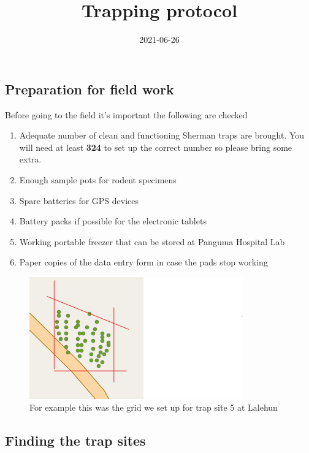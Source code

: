 \documentclass[
]{article}
\title{Trapping protocol}
\author{}
\date{\vspace{-2.5em}2021-06-26}
\providecommand{\tightlist}{%
  \setlength{\itemsep}{0pt}\setlength{\parskip}{0pt}}
\begin{document}
\maketitle

\hypertarget{preparation-for-field-work}{%
\subsection{Preparation for field
work}\label{preparation-for-field-work}}

Before going to the field it's important the following are checked

\begin{enumerate}
\def\labelenumi{\arabic{enumi}.}
\tightlist
\item
  Adequate number of clean and functioning Sherman traps are brought.
  You will need at least \textbf{324} to set up the correct number so
  please bring some extra.
\item
  Enough sample pots for rodent specimens
\item
  Spare batteries for GPS devices
\item
  Battery packs if possible for the electronic tablets
\item
  Working portable freezer that can be stored at Panguma Hospital Lab
\item
  Paper copies of the data entry form in case the pads stop working
\end{enumerate}

\begin{figure}
\centering
\includegraphics{figures/grid.png}
\caption{For example this was the grid we set up for trap site 5 at
Lalehun}
\end{figure}

\hypertarget{finding-the-trap-sites}{%
\subsection{Finding the trap sites}\label{finding-the-trap-sites}}
\end{document}

